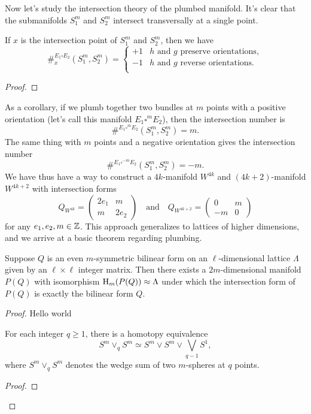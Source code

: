 Now let's study the intersection theory of the plumbed manifold. It's clear that the submanifolds $S_1^m$ and $S_2^m$ intersect transversally at a single point.

\begin{proposition}
	If $x$ is the intersection point of $S_1^m$ and $S_2^m$, then we have
	\[
		\#^{E_1\square E_2}_{x}(S_1^m, S_2^m) = \begin{cases}
			+1 & h \textrm{ and }g\textrm{ preserve orientations}, \\
			-1 & h \textrm{ and }g\textrm{ reverse orientations}.  \\
		\end{cases}
	\]
\end{proposition}
\begin{proof}
\end{proof}

As a corollary, if we plumb together two bundles at $m$ points with a positive orientation (let's call this manifold $E_1\square^m E_2$), then the intersection number is \[\#^{E_1\square^m E_2}(S^m_1, S^m_2)=m.\] The same thing with $m$ points and a negative orientation gives the intersection number \[\#^{E_1\square^{-m} E_2}(S^m_1,S^m_2)=-m.\]
We have thus have a way to construct a $4k$-manifold $W^{4k}$ and $(4k+2)$-manifold $W^{4k+2}$ with intersection forms
\[
	Q_{W^{4k}} = \begin{pmatrix} 2e_1 & m \\ m & 2e_2\end{pmatrix}
	\quad\textrm{and}\quad
	Q_{W^{4k+2}} = \begin{pmatrix} 0 & m \\ -m & 0\end{pmatrix}
\]
for any $e_1, e_2,m\in \mathbb{Z}$. This approach generalizes to lattices of higher dimensions, and we arrive at a basic theorem regarding plumbing.

\begin{theorem}
	Suppose $Q$ is an even $m$-symmetric bilinear form on an $\ell$-dimensional lattice $\Lambda$ given by an $\ell\times \ell$ integer matrix. Then there exists a $2m$-dimensional manifold $P(Q)$ with isomorphism $\operatorname{H}_{m}(P(Q))\approx \Lambda$ under which the intersection form of $P(Q)$ is exactly the bilinear form $Q$.
\end{theorem}

\begin{proof}
	Hello world


	\begin{lemma}
		For each integer $q\geq 1$, there is a homotopy equivalence
		\[
			S^m\vee_q S^m \simeq S^m\vee S^m \vee \bigvee_{q-1} S^1,
		\]
		where $S^m\vee_q S^m$ denotes the wedge sum of two $m$-spheres at $q$ points.
	\end{lemma}
	\begin{proof}
	\end{proof}

\end{proof}


